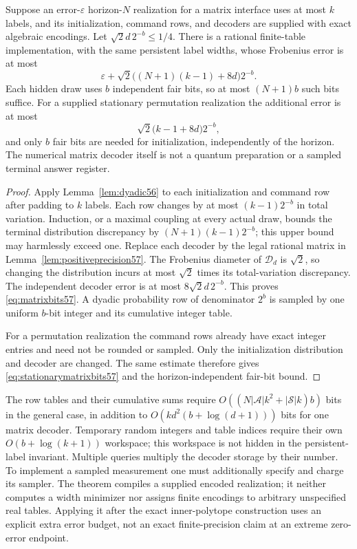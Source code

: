 \begin{theorem}
\label{thm:matrixbits57}
Suppose an error-$\varepsilon$ horizon-$N$ realization for a matrix
interface uses at most $k$ labels, and its initialization, command rows,
and decoders are supplied with exact algebraic encodings. Let
$\sqrt2d\,2^{-b}\le1/4$. There is a rational finite-table implementation,
with the same persistent label widths, whose Frobenius error is at most
\begin{equation}\label{eq:matrixbits57}
 \varepsilon+\sqrt2\bigl((N+1)(k-1)+8d\bigr)2^{-b}.
\end{equation}
Each hidden draw uses $b$ independent fair bits, so at most $(N+1)b$ such
bits suffice. For a supplied stationary permutation realization the
additional error is at most
\begin{equation}\label{eq:stationarymatrixbits57}
                  \sqrt2\bigl(k-1+8d\bigr)2^{-b},
\end{equation}
and only $b$ fair bits are needed for initialization, independently of the
horizon. The numerical matrix decoder itself is not a quantum preparation
or a sampled terminal answer register.
\end{theorem}
\begin{proof}
Apply Lemma~\ref{lem:dyadic56} to each initialization and command row after
padding to $k$ labels. Each row changes by at most $(k-1)2^{-b}$ in total
variation. Induction, or a maximal coupling at every actual draw, bounds
the terminal distribution discrepancy by $(N+1)(k-1)2^{-b}$; this upper
bound may harmlessly exceed one. Replace each decoder by the legal
rational matrix in Lemma~\ref{lem:positiveprecision57}. The Frobenius
diameter of $\mathcal D_d$ is $\sqrt2$, so changing the distribution incurs
at most $\sqrt2$ times its total-variation discrepancy. The independent
decoder error is at most $8\sqrt2d\,2^{-b}$. This proves
\eqref{eq:matrixbits57}. A dyadic probability row of denominator $2^b$ is
sampled by one uniform $b$-bit integer and its cumulative integer table.

For a permutation realization the command rows already have exact
integer entries and need not be rounded or sampled. Only the
initialization distribution and decoder are changed. The same estimate
therefore gives \eqref{eq:stationarymatrixbits57} and the horizon-independent
fair-bit bound.
\end{proof}
The row tables and their cumulative sums require
$O((N|\mathcal A|k^2+|\mathcal S|k)b)$ bits in the general case, in addition
to $O(kd^2(b+\log(d+1)))$ bits for one matrix decoder. Temporary random
integers and table indices require their own $O(b+\log(k+1))$ workspace;
this workspace is not hidden in the persistent-label invariant. Multiple
queries multiply the decoder storage by their number. To implement a
sampled measurement one must additionally specify and charge its sampler.
The theorem compiles a supplied encoded realization; it neither computes
a width minimizer nor assigns finite encodings to arbitrary unspecified
real tables. Applying it after the exact inner-polytope construction uses
an explicit extra error budget, not an exact finite-precision claim at an
extreme zero-error endpoint.
